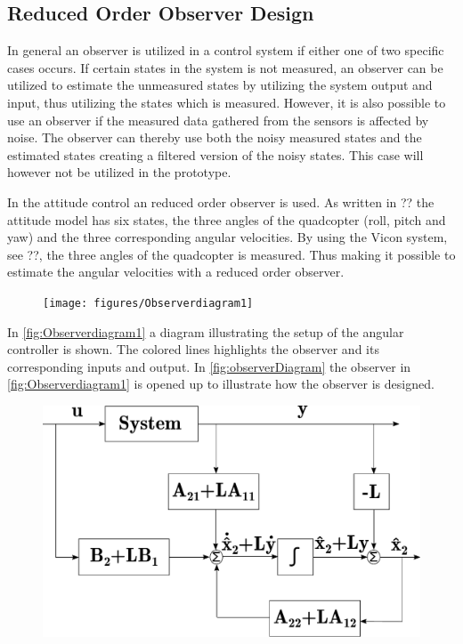 \subsection{Reduced Order Observer Design}

In general an observer is utilized in a control system if either one of two specific cases occurs. If certain states in the system is not measured, an observer can be utilized to estimate the unmeasured states by utilizing the system output and input, thus utilizing the states which is measured. However, it is also possible to use an observer if the measured data gathered from the sensors is affected by noise. The observer can thereby use both the noisy measured states and the estimated states creating a filtered version of the noisy states. This case will however not be utilized in the prototype.

In the attitude control an reduced order observer is used. As written in ?? the attitude model has six states, the three angles of the quadcopter (roll, pitch and yaw) and the three corresponding angular velocities. By using the Vicon system, see ??, the three angles of the quadcopter is measured. Thus making it possible to estimate the angular velocities with a reduced order observer. 

\begin{figure}[H]
\texttt{[image: figures/Observerdiagram1]}
\centering
\captionsetup{justification=centering}
\label{fig:Observerdiagram1}
\end{figure}

In \autoref{fig:Observerdiagram1} a diagram illustrating the setup of the angular controller is shown. The colored lines highlights the observer and its corresponding inputs and output. In \autoref{fig:observerDiagram} the observer in \autoref{fig:Observerdiagram1} is opened up to illustrate how the observer is designed.

\begin{figure}[H]
	\includegraphics[scale=.35]{figures/observerDiagram}
	\centering
	\captionsetup{justification=centering}
	\label{fig:observerDiagram}
\end{figure}

